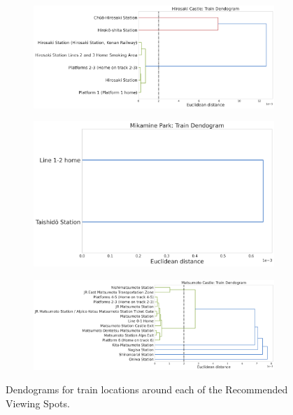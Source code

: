 \documentclass[11pt]{article}
\begin{document}
\begin{figure}[H]
  \vfill
  \centering
  \begin{subfigure}[c]{0.45\textwidth}
    \centering
    \includegraphics[width=\textwidth]{images/Hirosaki Castle__threshold.png}
  \end{subfigure}
  \hfill
  \begin{subfigure}[c]{0.4 \textwidth}
    \centering
    \includegraphics[width=\textwidth]{images/Mikamine Park__threshold.png}
  \end{subfigure}

  \vfill
  \begin{subfigure}[b]{0.6\textwidth}
    \centering
    \includegraphics[width=\textwidth]{images/Matsumoto Castle__threshold.png}
  \end{subfigure}
  \caption{Dendograms for train locations around each of the Recommended Viewing Spots.}
\end{figure}
\end{document}

